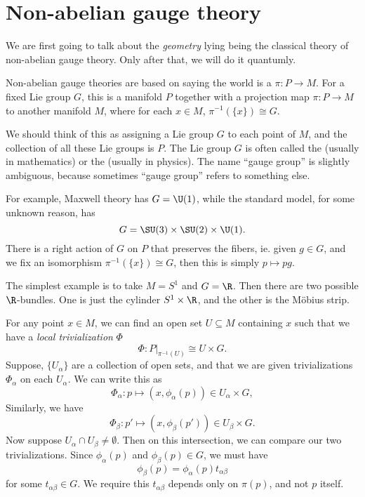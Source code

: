 \documentclass[a4paper]{article}
\begin{document}
\section{Non-abelian gauge theory}
We are first going to talk about the \emph{geometry} lying being the classical theory of non-abelian gauge theory. Only after that, we will do it quantumly.

Non-abelian gauge theories are based on saying the world is a  $\pi: P \to M$. For a fixed Lie group $G$, this is a manifold $P$ together with a projection map $\pi: P \to M$ to another manifold $M$, where for each $x \in M$,  $\pi^{-1}(\{x\}) \cong G$.

We should think of this as assigning a Lie group $G$ to each point of $M$, and the collection of all these Lie groups is $P$. The Lie group $G$ is often called the  (usually in mathematics) or the  (usually in physics). The name ``gauge group'' is slightly ambiguous, because sometimes ``gauge group'' refers to something else.

For example, Maxwell theory has $G = \U(1)$, while the standard model, for some unknown reason, has
\[
  G = \SU(3) \times \SU(2) \times \U(1).
\]
There is a right action of $G$ on $P$ that preserves the fibers, ie. given $g \in G$, and we fix an isomorphism $\pi^{-1}(\{x\}) \cong G$, then this is simply $p \mapsto pg$. %

The simplest example is to take $M = S^1$ and $G = \R$. Then there are two possible $\R$-bundles. One is just the cylinder $S^1 \times \R$, and the other is the M\"obius strip. %

For any point $x \in M$, we can find an open set $U \subseteq M$ containing $x$ such that we have a \emph{local trivialization} $\Phi$
\[
  \Phi: P|_{\pi^{-1}(U)} \cong U \times G.
\]
Suppose, $\{U_\alpha\}$ are a collection of open sets, and that we are given trivializations $\Phi_\alpha$ on each $U_\alpha$. We can write this as
\[
  \Phi_\alpha: p \mapsto (x, \phi_\alpha(p)) \in U_\alpha \times G,
\]
Similarly, we have
\[
  \Phi_\beta: p' \mapsto (x, \phi_\beta(p')) \in U_\beta \times G.
\]
Now suppose $U_\alpha \cap U_\beta \not= \emptyset$. Then on this intersection, we can compare our two trivializations. Since $\phi_\alpha(p)$ and $\phi_\beta(p) \in G$, we must have
\[
  \phi_\beta(p) = \phi_\alpha(p) t_{\alpha\beta}
\]
for some $t_{\alpha\beta} \in G$. We require this $t_{\alpha\beta}$ depends only on $\pi(p)$, and not $p$ itself.
\end{document}
